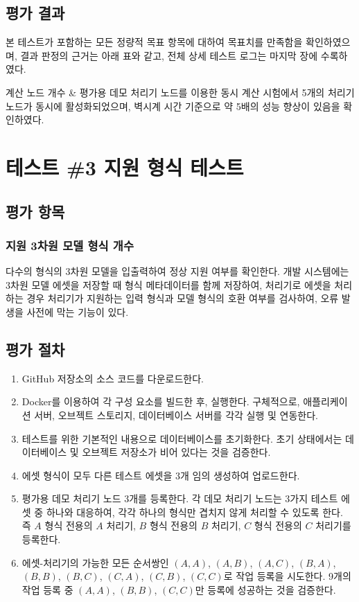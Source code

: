 \documentclass[11pt,oneside,openany,itemph,a4paper,chapter]{oblivoir}
\newenvironment{tablekeyvalue}[2]
{\bgroup
\table[H] \tabularx{\linewidth}{|
>{\setlength{\baselineskip}{1.2\baselineskip}}P{#1\linewidth}|
>{\setlength{\baselineskip}{1.2\baselineskip}}P{#2\linewidth}|}
\hline}
{\endtabularx \endtable \egroup}
\begin{document}
\subsection{평가 결과}
본 테스트가 포함하는 모든 정량적 목표 항목에 대하여 목표치를 만족함을 확인하였으며, 결과 판정의 근거는 아래 표와 같고, 전체 상세 테스트 로그는 마지막 장에 수록하였다.

\begin{tablekeyvalue}{0.3}{0.7}
계산 노드 개수 & 평가용 데모 처리기 노드를 이용한 동시 계산 시험에서 5개의 처리기 노드가 동시에 활성화되었으며, 벽시계 시간 기준으로 약 5배의 성능 향상이 있음을 확인하였다.  \\ \hline
\end{tablekeyvalue}

\section{테스트 \#3\label{test3} 지원 형식 테스트}
\subsection{평가 항목}
\subsubsection{지원 3차원 모델 형식 개수}
다수의 형식의 3차원 모델을 입출력하여 정상 지원 여부를 확인한다. 개발 시스템에는 3차원 모델 에셋을 저장할 때 형식 메타데이터를 함께 저장하여, 처리기로 에셋을 처리하는 경우 처리기가 지원하는 입력 형식과 모델 형식의 호환 여부를 검사하여, 오류 발생을 사전에 막는 기능이 있다.

\subsection{평가 절차}
\begin{enumerate}
    \item GitHub 저장소의 소스 코드를 다운로드한다.
    \item Docker를 이용하여 각 구성 요소를 빌드한 후, 실행한다. 구체적으로, 애플리케이션 서버, 오브젝트 스토리지, 데이터베이스 서버를 각각 실행 및 연동한다.
    \item 테스트를 위한 기본적인 내용으로 데이터베이스를 초기화한다. 초기 상태에서는 데이터베이스 및 오브젝트 저장소가 비어 있다는 것을 검증한다.
    \item 에셋 형식이 모두 다른 테스트 에셋을 3개 임의 생성하여 업로드한다.
    \item 평가용 데모 처리기 노드 3개를 등록한다. 각 데모 처리기 노드는 3가지 테스트 에셋 중 하나와 대응하여, 각각 하나의 형식만 겹치지 않게 처리할 수 있도록 한다. 즉 $A$ 형식 전용의 $A$ 처리기, $B$ 형식 전용의 $B$ 처리기, $C$ 형식  전용의 $C$ 처리기를 등록한다.
    \item 에셋-처리기의 가능한 모든 순서쌍인 $(A, A)$, $(A, B)$, $(A, C)$, $(B, A)$, $(B, B)$, $(B, C)$, $(C, A)$, $(C, B)$, $(C, C)$로 작업 등록을 시도한다. 9개의 작업 등록 중 $(A, A)$, $(B, B)$, $(C, C)$만 등록에 성공하는 것을 검증한다.
\end{enumerate}
\end{document}
